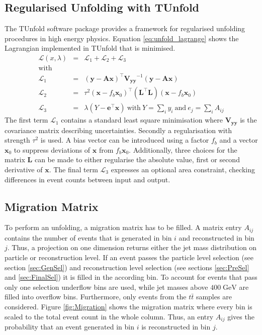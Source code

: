 \subsection{Regularised Unfolding with TUnfold}
	The TUnfold software package \cite{tunfold} provides a framework for regularised unfolding procedures in high energy physics. Equation \ref{eq:unfold_lagrange} shows the Lagrangian implemented in TUnfold that is minimised.
	\begin{eqnarray}
	\label{eq:unfold_lagrange}
	\mathcal{L}(x,\lambda) &=& \mathcal{L}_1 + \mathcal{L}_2 + \mathcal{L}_3 
	\\ \nonumber \text{with}
	\\ 
	\label{eq:unfold_lagrange1}
	\mathcal{L}_1 &=& (\mathbf{y} - \mathbf{Ax})^\intercal \mathbf{V_{yy}}^{-1} (\mathbf{y} - \mathbf{Ax}) 
	\\
	\label{eq:unfold_lagrange2}
	\mathcal{L}_2 &=& \tau^2 (\mathbf{x} - f_b \mathbf{x}_0)^\intercal (\mathbf{L}^\intercal \mathbf{L}) (\mathbf{x} - f_b \mathbf{x}_0) 
	\\
	\label{eq:unfold_lagrange3}
	\mathcal{L}_3 &=& \lambda (Y-\mathbf{e}^\intercal \mathbf{x}) \ \text{with} \ Y=\sum_{i} y_i \ \text{and} \ e_j = \sum_{i}A_{ij}
	\end{eqnarray}
	The first term $\mathcal{L}_1$ contains a standard least square minimisation where $\mathbf{V_{yy}}$ is the covariance matrix describing uncertainties. Secondly a regularisation with strength $\tau^2$ is used. A bias vector can be introduced using a factor $f_b$ and a vector $\mathbf{x}_0$ to suppress deviations of $\mathbf{x}$ from $f_b\mathbf{x}_0$. Additionally, three choices for the matrix $\mathbf{L}$ can be made to either regularise the absolute value, first or second derivative of $\mathbf{x}$. The final term $\mathcal{L}_3$ expresses an optional area constraint, checking differences in event counts between input and output.
	
\subsection{Migration Matrix}
	To perform an unfolding, a migration matrix has to be filled. A matrix entry $A_{ij}$ contains the number of events that is generated in bin $i$ and reconstructed in bin $j$. Thus, a projection on one dimension returns either the jet mass distribution on particle or reconstruction level. If an event passes the particle level selection (see section \ref{sec:GenSel}) and reconstruction level selection (see sections \ref{sec:PreSel} and \ref{sec:FinalSel}) it is filled in the according bin. To account for events that pass only one selection underflow bins are used, while jet masses above $400\;\text{GeV}$ are filled into overflow bins. Furthermore, only events from the $t\bar{t}$ samples are considered. Figure \ref{fig:Migration} shows the migration matrix where every bin is scaled to the total event count in the whole column. Thus, an entry $A_{ij}$ gives the probability that an event generated in bin $i$ is reconstructed in bin $j$.
	
